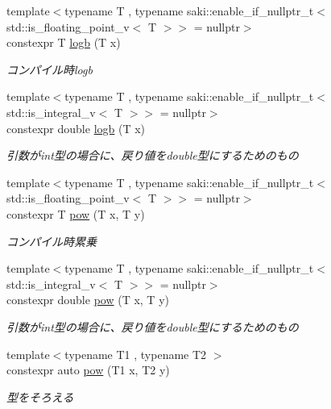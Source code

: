 \begin{DoxyCompactItemize}
{\footnotesize template$<$typename T , typename saki\+::enable\+\_\+if\+\_\+nullptr\+\_\+t$<$ std\+::is\+\_\+floating\+\_\+point\+\_\+v$<$ T $>$$>$  = nullptr$>$ }\\constexpr T \mbox{\hyperlink{namespacesaki_ab7e81af48b13fbf88f135d296471bac1}{logb}} (T x)
\begin{DoxyCompactList}\small\item\em コンパイル時logb \end{DoxyCompactList}\item 
{\footnotesize template$<$typename T , typename saki\+::enable\+\_\+if\+\_\+nullptr\+\_\+t$<$ std\+::is\+\_\+integral\+\_\+v$<$ T $>$$>$  = nullptr$>$ }\\constexpr double \mbox{\hyperlink{namespacesaki_adf4ba562bb9897e98b75eb95027bfad5}{logb}} (T x)
\begin{DoxyCompactList}\small\item\em 引数がint型の場合に、戻り値をdouble型にするためのもの \end{DoxyCompactList}\item 
{\footnotesize template$<$typename T , typename saki\+::enable\+\_\+if\+\_\+nullptr\+\_\+t$<$ std\+::is\+\_\+floating\+\_\+point\+\_\+v$<$ T $>$$>$  = nullptr$>$ }\\constexpr T \mbox{\hyperlink{namespacesaki_aa5b66f18d7c8c94b4c50731449ed3240}{pow}} (T x, T y)
\begin{DoxyCompactList}\small\item\em コンパイル時累乗 \end{DoxyCompactList}\item 
{\footnotesize template$<$typename T , typename saki\+::enable\+\_\+if\+\_\+nullptr\+\_\+t$<$ std\+::is\+\_\+integral\+\_\+v$<$ T $>$$>$  = nullptr$>$ }\\constexpr double \mbox{\hyperlink{namespacesaki_a53b0e93733e85d7c6ab17aea25072536}{pow}} (T x, T y)
\begin{DoxyCompactList}\small\item\em 引数がint型の場合に、戻り値をdouble型にするためのもの \end{DoxyCompactList}\item 
{\footnotesize template$<$typename T1 , typename T2 $>$ }\\constexpr auto \mbox{\hyperlink{namespacesaki_aede1168d9c20adf475c0a27670925c34}{pow}} (T1 x, T2 y)
\begin{DoxyCompactList}\small\item\em 型をそろえる \end{DoxyCompactList}\item 

\end{DoxyCompactItemize}
